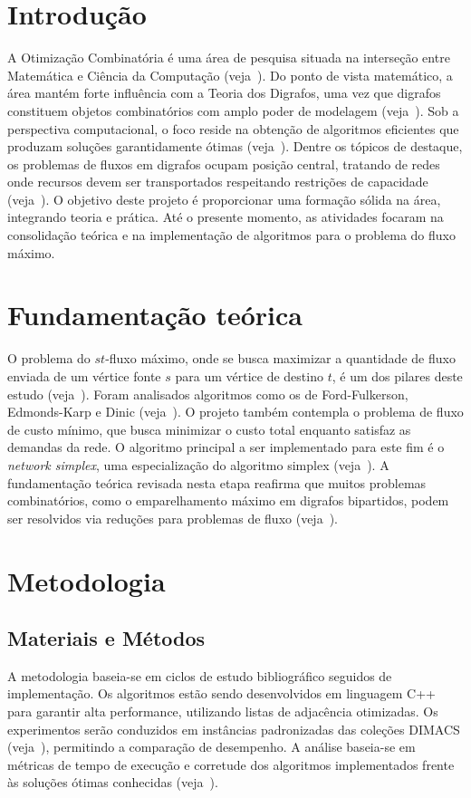 \documentclass[12pt,a4paper]{article}
\begin{document}
\section{Introdução}
A Otimização Combinatória é uma área de pesquisa situada na interseção entre Matemática e Ciência da Computação (veja~\cite{korte2018combinatorial}). Do ponto de vista matemático, a área mantém forte influência com a Teoria dos Digrafos, uma vez que digrafos constituem objetos combinatórios com amplo poder de modelagem (veja~\cite{bondy2008graph, diestel2017graph}).
Sob a perspectiva computacional, o foco reside na obtenção de algoritmos eficientes que produzam soluções garantidamente ótimas (veja~\cite{schrijver2003combinatorial, cook1998combinatorial}). Dentre os tópicos de destaque, os problemas de fluxos em digrafos ocupam posição central, tratando de redes onde recursos devem ser transportados respeitando restrições de capacidade (veja~\cite{ahuja1993network}).
O objetivo deste projeto é proporcionar uma formação sólida na área, integrando teoria e prática. Até o presente momento, as atividades focaram na consolidação teórica e na implementação de algoritmos para o problema do fluxo máximo.

\section{Fundamentação teórica}
O problema do $st$-fluxo máximo, onde se busca maximizar a quantidade de fluxo enviada de um vértice fonte $s$ para um vértice de destino $t$, é um dos pilares deste estudo (veja~\cite{ford1956maximal}). Foram analisados algoritmos como os de Ford-Fulkerson, Edmonds-Karp e Dinic (veja~\cite{ford1956maximal, edmonds1972theoretical, dinic1970algorithm}).
O projeto também contempla o problema de fluxo de custo mínimo, que busca minimizar o custo total enquanto satisfaz as demandas da rede. O algoritmo principal a ser implementado para este fim é o \textit{network simplex}, uma especialização do algoritmo simplex (veja~\cite{dantzig1951application, ahuja1993network}).
A fundamentação teórica revisada nesta etapa reafirma que muitos problemas combinatórios, como o emparelhamento máximo em digrafos bipartidos, podem ser resolvidos via reduções para problemas de fluxo (veja~\cite{ahuja1993network}).

\section{Metodologia}
\subsection{Materiais e Métodos}
A metodologia baseia-se em ciclos de estudo bibliográfico seguidos de implementação. Os algoritmos estão sendo desenvolvidos em linguagem C++ para garantir alta performance, utilizando listas de adjacência otimizadas.
Os experimentos serão conduzidos em instâncias padronizadas das coleções DIMACS (veja~\cite{Jensen2022}), permitindo a comparação de desempenho. A análise baseia-se em métricas de tempo de execução e corretude dos algoritmos implementados frente às soluções ótimas conhecidas (veja~\cite{ford1956maximal}).
\end{document}
